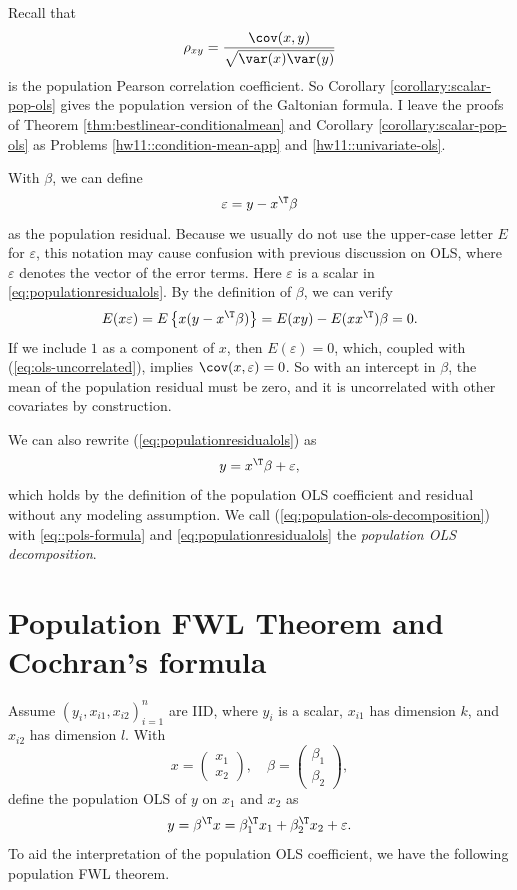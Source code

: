 Recall that 
$$
\rho_{xy}  = \frac{   \cov(x,y)   }{   \sqrt{   \var(x) \var(y)  }    }
$$
is the population Pearson correlation coefficient. So Corollary \ref{corollary:scalar-pop-ols} gives the population version of the Galtonian formula. 
I leave the proofs of Theorem \ref{thm:bestlinear-conditionalmean} and Corollary \ref{corollary:scalar-pop-ols} as Problems \ref{hw11::condition-mean-app} and \ref{hw11::univariate-ols}.



 
With $\beta$, we can define
\begin{equation}
\varepsilon=y-x^{\T}\beta\label{eq:populationresidualols}
\end{equation}
as the population residual. Because we usually do not use the upper-case letter $E$ for $\varepsilon$, this notation may cause confusion with previous discussion on OLS,  where $\varepsilon$ denotes the vector of the error terms. Here $\varepsilon$ is a scalar in \eqref{eq:populationresidualols}.   
By the definition of $\beta$, we can verify
\begin{equation}
E(x\varepsilon)=E\left\{ x(y-x^{\T}\beta)\right\} =E(xy)-E(xx^{\T})\beta=0.\label{eq:ols-uncorrelated}
\end{equation}
If we include $1$ as a component of $x$, then $E(\varepsilon)=0$,
which, coupled with (\ref{eq:ols-uncorrelated}), implies $\cov(x,\varepsilon)=0$.
So with an intercept in $\beta$, the mean of the population residual
must be zero, and it is uncorrelated with other covariates by construction. 

We can also rewrite (\ref{eq:populationresidualols}) as
\begin{equation}
y=x^{\T}\beta+\varepsilon,\label{eq:population-ols-decomposition}
\end{equation}
which holds by the definition of the population OLS coefficient and residual without any modeling
assumption. We call (\ref{eq:population-ols-decomposition}) with \eqref{eq::pols-formula} and \eqref{eq:populationresidualols} the {\it  population
OLS decomposition}. 


\section{Population FWL Theorem and Cochran's formula}


Assume $(y_i, x_{i1}, x_{i2})_{i=1}^n$ are IID, where $y_i$ is a scalar, $x_{i1}$ has dimension $k$, and $x_{i2}$ has dimension $l$. 
With
$$
x = \begin{pmatrix}
x_1\\
x_2
\end{pmatrix}, 
\quad
\beta = \begin{pmatrix}
\beta_1 \\
\beta_2
\end{pmatrix},
$$
define the population OLS of $y$ on $x_1$ and $x_2$ as
\begin{equation}\label{eq::population-ols-long}
y = \beta^{\T} x =  \beta_1^{\T} x_1 +  \beta_2 ^{\T} x_2+ \varepsilon.
\end{equation}
To aid the interpretation of the population OLS coefficient, we have the following population FWL theorem.


